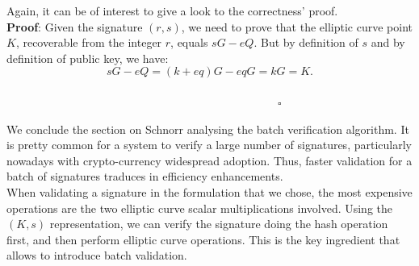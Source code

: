 \bigskip
\noindent
Again, it can be of interest to give a look to the correctness' proof.
\\
{\bf Proof}: Given the signature $(r, s)$, we need to prove that the elliptic curve point $K$, recoverable from the integer $r$, equals $sG - eQ$. But by definition of $s$ and by definition of public key, we have:
$$sG - eQ = (k + eq)G - eqG = kG = K.$$ 
\ \ \ \ \ \ \ \ \ \ \ \ \ \ \ \ \ \ \ \ \ \ \ \ \ \ \ \ \ \ \ \ \ \ \ \ \ \ \ \ \ \ \ \ \ \ \ \ \ \ \ \ \ \ \ \ \ \ \ \ \ \ \ \ \ \ \ \ \ \ \ \ \ \ \ \ \ \ \ \ \ \ \ \ \ \ \ \ \ \ \ \ \ \ \ \ \ \ \ \ \ \ \ \ \ \ \ \ \ \ \ \ \ \ \ \ \ \ \ \ $\square$

\bigskip
\noindent
We conclude the section on Schnorr analysing the batch verification algorithm. It is pretty common for a system to verify a large number of signatures, particularly nowadays with crypto-currency widespread adoption. Thus, faster validation for a batch of signatures traduces in efficiency enhancements.
\\
When validating a signature in the formulation that we chose, the most expensive operations are the two elliptic curve scalar multiplications involved. Using the $(K, s)$ representation, we can verify the signature doing the hash operation first, and then perform elliptic curve operations. This is the key ingredient that allows to introduce batch validation.


